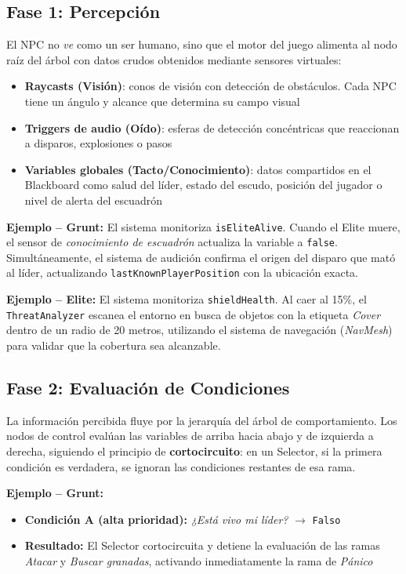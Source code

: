 \documentclass[12pt,letterpaper]{article}
\begin{document}
\subsection{Fase 1: Percepción}

El NPC no \textit{ve} como un ser humano, sino que el motor del juego alimenta al nodo raíz del árbol con datos crudos obtenidos mediante sensores virtuales:

\begin{itemize}[nosep]
  \item \textbf{Raycasts (Visión)}: conos de visión con detección de obstáculos. Cada NPC tiene un ángulo y alcance que determina su campo visual
  \item \textbf{Triggers de audio (Oído)}: esferas de detección concéntricas que reaccionan a disparos, explosiones o pasos
  \item \textbf{Variables globales (Tacto/Conocimiento)}: datos compartidos en el Blackboard como salud del líder, estado del escudo, posición del jugador o nivel de alerta del escuadrón
\end{itemize}

\textbf{Ejemplo -- Grunt:} El sistema monitoriza \texttt{isEliteAlive}. Cuando el Elite muere, el sensor de \textit{conocimiento de escuadrón} actualiza la variable a \texttt{false}. Simultáneamente, el sistema de audición confirma el origen del disparo que mató al líder, actualizando \texttt{lastKnownPlayerPosition} con la ubicación exacta.

\textbf{Ejemplo -- Elite:} El sistema monitoriza \texttt{shieldHealth}. Al caer al 15\%, el \texttt{ThreatAnalyzer} escanea el entorno en busca de objetos con la etiqueta \textit{Cover} dentro de un radio de 20 metros, utilizando el sistema de navegación (\textit{NavMesh}) para validar que la cobertura sea alcanzable.

\subsection{Fase 2: Evaluación de Condiciones}

La información percibida fluye por la jerarquía del árbol de comportamiento. Los nodos de control evalúan las variables de arriba hacia abajo y de izquierda a derecha, siguiendo el principio de \textbf{cortocircuito}: en un Selector, si la primera condición es verdadera, se ignoran las condiciones restantes de esa rama.

\textbf{Ejemplo -- Grunt:}
\begin{itemize}[nosep]
  \item \textbf{Condición A (alta prioridad):} \textit{¿Está vivo mi líder?} $\to$ \texttt{Falso}
  \item \textbf{Resultado:} El Selector cortocircuita y detiene la evaluación de las ramas \textit{Atacar} y \textit{Buscar granadas}, activando inmediatamente la rama de \textit{Pánico}
\end{itemize}
\end{document}
